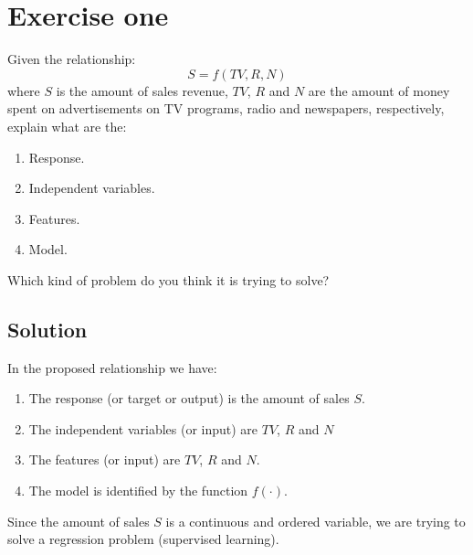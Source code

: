 \section{Exercise one}

Given the relationship:
\[S = f(T V, R, N)\]
where $S$ is the amount of sales revenue, $T V$, $R$ and $N$ are the amount of money spent on advertisements on TV programs, radio and newspapers, respectively, explain what are the:
\begin{enumerate}
    \item Response. 
    \item Independent variables. 
    \item Features. 
    \item Model. 
\end{enumerate}
Which kind of problem do you think it is trying to solve?

\subsection{Solution}
In the proposed relationship we have:
\begin{enumerate}
    \item The response (or target or output) is the amount of sales $S$. 
    \item The independent variables (or input) are $T V$, $R$ and $N$
    \item The features (or input) are $T V$, $R$ and $N$. 
    \item The model is identified by the function $f(\cdot)$.
\end{enumerate}
Since the amount of sales $S$ is a continuous and ordered variable, we are trying to solve a regression problem (supervised learning).